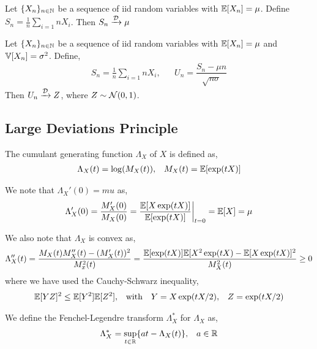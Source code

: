 \documentclass[12pt]{article}
\begin{document}
\begin{theorem}
Let \( \{X_n\}_{n\in\mathbb{N}} \) be a sequence of iid random variables with \( \mathbb{E}[X_n]=\mu \). Define \( S_n = \frac{1}{n}\sum_{i=1}{n} X_i \). Then \( S_n\xrightarrow{\mathcal{D}}\mu \)
\end{theorem}

\begin{theorem}
Let \( \{X_n\}_{n\in\mathbb{N}} \) be a sequence of iid random variables with \( \mathbb{E}[X_n]=\mu \) and \( \mathbb{V}[X_n] = \sigma^2 \). Define,
\begin{align*}
    S_n = \frac{1}{n}\sum_{i=1}{n} X_i, && U_n = \dfrac{S_n - \mu n}{\sqrt{n\sigma}}
\end{align*}
Then \( U_n \xrightarrow{\mathcal{D}} Z \), where \( Z\sim\mathcal{N}(0,1) \).
\end{theorem}

\subsection{Large Deviations Principle}

\begin{definition}
The cumulant generating function \( \Lambda_X \) of \( X \) is defined as,
\begin{align*}
    \Lambda_X(t) = \log(M_X(t)), && M_X(t)  = \mathbb{E}[ \exp(tX) ]
\end{align*}
\end{definition}

We note that \( \Lambda_X'(0) = mu \) as,
\begin{align*}
    \Lambda_X'(0) = \dfrac{M_X'(0)}{M_X(0)} = \dfrac{\mathbb{E}[X\exp(tX)]}{\mathbb{E}[\exp(tX)]} \bigg|_{t=0} = \mathbb{E}[X] = \mu
\end{align*}

We also note that \( \Lambda_X \) is convex as,
\begin{align*}
    \Lambda_X''(t) = \dfrac{M_X(t)M_X''(t)-(M_X'(t))^2}{M_x^2(t)}
    = \dfrac{\mathbb{E}[\exp(tX)] \mathbb{E}[X^2\exp(tX)-\mathbb{E}[X \exp(tX)]^2}{M_X^2(t)} \geq 0
\end{align*}
where we have used the Cauchy-Schwarz inequality,
\begin{align*}
    \mathbb{E}[YZ]^2 \leq \mathbb{E}[Y^2]\mathbb{E}[Z^2], &&\text{with} && Y = X\exp(tX/2), && Z = \exp(tX/2)
\end{align*}

\begin{definition}
We define the Fenchel-Legendre transform \( \Lambda_X^* \) for \( \Lambda_X \) as,
\begin{align*}
    \Lambda_X^* = \sup_{t\in\mathbb{R}}\{at-\Lambda_X(t)\}, && a\in\mathbb{R}
\end{align*}
\end{definition}
\end{document}
